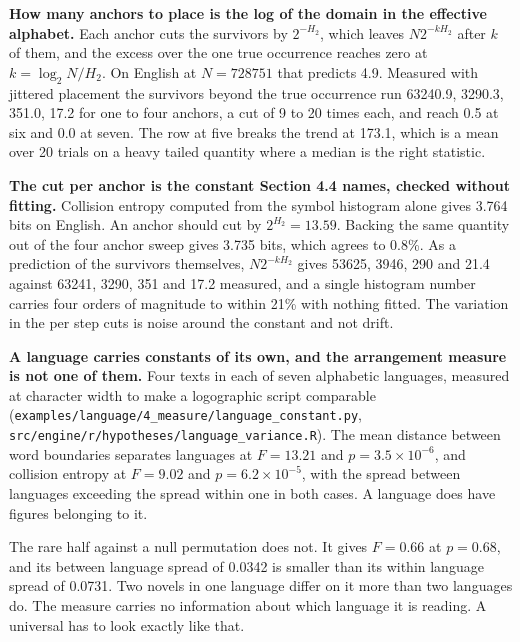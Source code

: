 \textbf{How many anchors to place is the log of the domain in the effective alphabet.} Each anchor cuts the survivors by \(2^{-H_2}\), which leaves \(N 2^{-kH_2}\) after \(k\) of them, and the excess over the one true occurrence reaches zero at \(k = \log_2 N / H_2\). On English at \(N = 728751\) that predicts 4.9. Measured with jittered placement the survivors beyond the true occurrence run 63240.9, 3290.3, 351.0, 17.2 for one to four anchors, a cut of 9 to 20 times each, and reach 0.5 at six and 0.0 at seven. The row at five breaks the trend at 173.1, which is a mean over 20 trials on a heavy tailed quantity where a median is the right statistic.

\textbf{The cut per anchor is the constant Section 4.4 names, checked without fitting.} Collision entropy computed from the symbol histogram alone gives 3.764 bits on English. An anchor should cut by \(2^{H_2} = 13.59\). Backing the same quantity out of the four anchor sweep gives 3.735 bits, which agrees to 0.8\%. As a prediction of the survivors themselves, \(N 2^{-kH_2}\) gives 53625, 3946, 290 and 21.4 against 63241, 3290, 351 and 17.2 measured, and a single histogram number carries four orders of magnitude to within 21\% with nothing fitted. The variation in the per step cuts is noise around the constant and not drift.

\textbf{A language carries constants of its own, and the arrangement measure is not one of them.} Four texts in each of seven alphabetic languages, measured at character width to make a logographic script comparable (\texttt{examples/\allowbreak{}language/\allowbreak{}4\_\allowbreak{}measure/\allowbreak{}language\_\allowbreak{}constant.\allowbreak{}py}, \texttt{src/\allowbreak{}engine/\allowbreak{}r/\allowbreak{}hypotheses/\allowbreak{}language\_\allowbreak{}variance.\allowbreak{}R}). The mean distance between word boundaries separates languages at \(F = 13.21\) and \(p = 3.5 \times 10^{-6}\), and collision entropy at \(F = 9.02\) and \(p = 6.2 \times 10^{-5}\), with the spread between languages exceeding the spread within one in both cases. A language does have figures belonging to it.

The rare half against a null permutation does not. It gives \(F = 0.66\) at \(p = 0.68\), and its between language spread of 0.0342 is smaller than its within language spread of 0.0731. Two novels in one language differ on it more than two languages do. The measure carries no information about which language it is reading. A universal has to look exactly like that.

